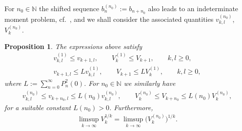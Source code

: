 \documentclass[11pt]{article}
\numberwithin{equation}{section}
\newtheorem{prop}[thm]{Proposition}
\begin{document}
For $n_0\in\mathbb N$ the shifted sequence $b_n^{(n_0)}:=b_{n+n_0}$ also leads to an indeterminate moment problem, cf.~\cite[p.~28]{Ak}, and we shall consider the associated quantities $v_{k,l}^{(n_0)}$, $V_k^{(n_0)}$.

\begin{prop}\label{thm:shiftV1} The expressions above satisfy
\begin{gather}\label{eq:shiftV1}
v_{k,l}^{(1)}\le v_{k+1,l},\qquad V_k^{(1)}\le V_{k+1},\qquad k,l\ge 0,\\
\label{eq:shiftV2}
v_{k+1,l}\le L v_{k,l}^{(1)},\qquad V_{k+1}\le L V_k^{(1)},\qquad k,l\ge 0,
\end{gather}
where $L:=\sum\limits_{n=0}^\infty P_n^2(0)$. For $n_0\in\mathbb N$ we similarly have
\begin{gather}\label{eq:shiftV1a}
v_{k,l}^{(n_0)}\le v_{k+n_0,l}\le L(n_0) v_{k,l}^{(n_0)},\qquad V_k^{(n_0)}\le V_{k+n_0}\le L(n_0) V_k^{(n_0)},
\end{gather}
for a suitable constant $L(n_0)>0$. Furthermore,
\begin{gather} \label{eq:shiftV3}
\limsup_{k\to\infty} V_k^{1/k}=\limsup_{k\to\infty} \big(V_k^{(n_0)}\big)^{1/k}.
\end{gather}
\end{prop}
\end{document}
